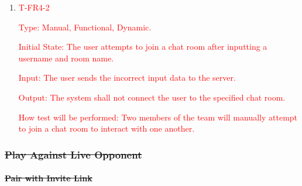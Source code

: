 \documentclass[12pt, titlepage]{article}
\begin{document}
        \begin{enumerate}
            
        \item{\textcolor{red}{T-FR4-2\\}}
        
            \textcolor{red}{Type: Manual, Functional, Dynamic.}
            					
            \textcolor{red}{Initial State: The user attempts to join a chat room after inputting a username and room name.}
            					
            \textcolor{red}{Input: The user sends the incorrect input data to the server.}
            					
            \textcolor{red}{Output: The system shall not connect the user to the specified chat room.}
            					
            \textcolor{red}{How test will be performed: Two members of the team will manually attempt to join a chat room to interact with one another.}

        \end{enumerate}

\subsubsection{\sout{Play Against Live Opponent}}

    \paragraph{\sout{Pair with Invite Link}}
\end{document}
